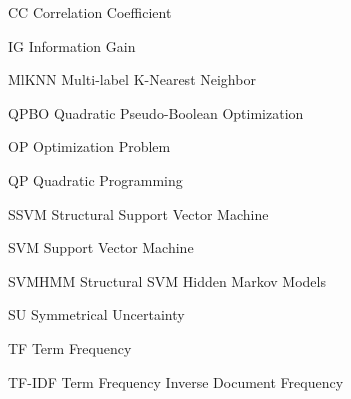 \newcommand{\abbrlabel}[1]{\makebox[3cm][l]{\textbf{#1}}}
\newenvironment{abbreviations}{\begin{list}{}{\renewcommand{\makelabel}{\abbrlabel}}}{\end{list}}
\begin{abbreviations}
	\item[CC] Correlation Coefficient
	\item[IG] Information Gain
	\item[MlKNN] Multi-label K-Nearest Neighbor
	\item[QPBO] Quadratic Pseudo-Boolean Optimization
	\item[OP] Optimization Problem
	\item[QP] Quadratic Programming
	\item[SSVM] Structural Support Vector Machine	
	\item[SVM] Support Vector Machine
	\item[SVMHMM] Structural SVM Hidden Markov Models
	\item[SU] Symmetrical Uncertainty
	\item[TF] Term Frequency
	\item[TF-IDF] Term Frequency Inverse Document Frequency
\end{abbreviations}
